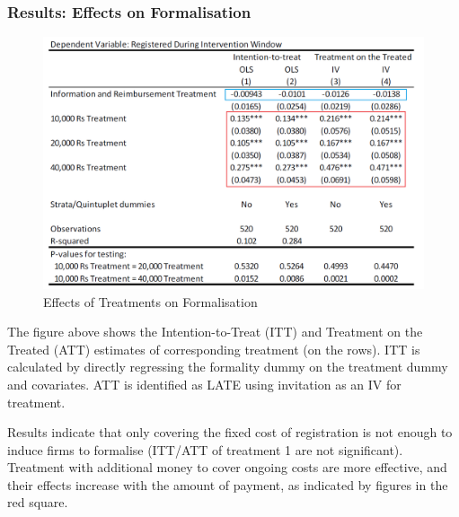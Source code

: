         \subsubsection{Results: Effects on Formalisation}
            \begin{figure}[H]
                \centering
                \includegraphics[width=5.5in]{images/ch5/SL formal treatment 2.png}
                \caption{Effects of Treatments on Formalisation}
            \end{figure}
            The figure above shows the Intention-to-Treat (ITT) and Treatment on the Treated (ATT) estimates of corresponding treatment (on the rows). ITT is calculated by directly regressing the formality dummy on the treatment dummy and covariates. ATT is identified as LATE using invitation as an IV for treatment.\par
            Results indicate that only covering the fixed cost of registration is not enough to induce firms to formalise (ITT/ATT of treatment 1 are not significant). Treatment with additional money to cover ongoing costs are more effective, and their effects increase with the amount of payment, as indicated by figures in the red square.
            
